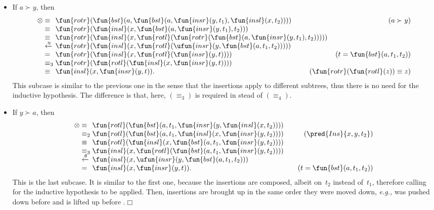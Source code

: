 \begin{itemize}
\begin{itemize}
    \item If \(a \succ y\), then
\begin{equation*}
\begin{array}{@{}r@{\;}l@{\;}l@{\hspace{-9mm}}r@{}}
  \otimes & \equiv & \fun{rotr}(\fun{bst}(a,
  \fun{bst}(a,\fun{insr}(y,t_1),\fun{insl}(x,t_2))))
  & (a \succ y)\\
  & \equiv &
  \fun{rotr}(\fun{insl}(x,\fun{bst}(a,\fun{insr}(y,t_1),t_2)))\\
  & \equiv & \fun{rotr}(\fun{insl}(x,
  \fun{rotl}(\fun{rotr}(\fun{bst}(a,\fun{insr}(y,t_1),t_2)))))\\
  & \xleftarrow{\smash{\eta}} &
  \fun{rotr}(\fun{insl}(x,\fun{rotl}(\ufun{insr}(y,
  \fun{bst}(a,t_1,t_2)))))\\
  & = & \fun{rotr}(\fun{insl}(x,\fun{rotl}(\fun{insr}(y,t))))
  & (t=\fun{bst}(a,t_1,t_2))\\
  & \equiv_3 &
  \fun{rotr}(\fun{rotl}(\fun{insl}(x,\fun{insr}(y,t))))\\
  & \equiv & \fun{insl}(x,\fun{insr}(y,t)).
  & (\fun{rotr}(\fun{rotl}(z)) \equiv z)
\end{array}
\end{equation*}
This subcase is similar to the previous one in the sense that the
insertions apply to different subtrees, thus there is no need for the
inductive hypothesis. The difference is that, here, \((\equiv_3)\) is
required in stead of \((\equiv_4)\).

  \item If \(y \succ a\), then
\begin{equation*}
\begin{array}{@{}r@{\;}l@{\;}l@{\qquad}r@{}}
  \otimes & \equiv &
  \fun{rotl}(\fun{bst}(a,t_1,\fun{insr}(y,\fun{insl}(x,t_2))))\\
  & \equiv_2 & \fun{rotl}(\fun{bst}(a,t_1,\fun{insl}(x,
  \fun{insr}(y,t_2)))) & (\pred{Ins}{x,y,t_2})\\
  & \equiv &
  \fun{rotl}(\fun{insl}(x,\fun{bst}(a,t_1,\fun{insr}(y,t_2))))\\
  & \equiv_3 & \fun{insl}(x,\fun{rotl}(\fun{bst}(a,t_1,
  \fun{insr}(y,t_2))))\\
  & \xleftarrow{\smash{\theta}}
  & \fun{insl}(x,\ufun{insr}(y,\fun{bst}(a,t_1,t_2)))\\
  & = & \fun{insl}(x,\fun{insr}(y,t)). & (t=\fun{bst}(a,t_1,t_2))
\end{array}
\end{equation*}
This is the last subcase. It is similar to the first one, because the
insertions are composed, albeit on~\(t_2\) instead of~\(t_1\),
therefore calling for the inductive hypothesis to be applied. Then,
insertions are brought up in the same order they were moved down,
\emph{e.g.,}  was pushed down before  and is
lifted up before .\hfill\(\Box\)
  \end{itemize}

\end{itemize}


